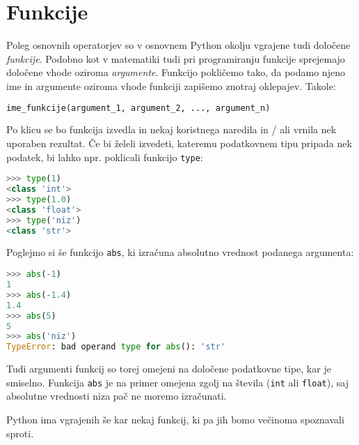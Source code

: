 \section{Funkcije}
Poleg osnovnih operatorjev so v osnovnem Python okolju vgrajene tudi določene \emph{funkcije}. Podobno kot v matematiki tudi pri programiranju funkcije sprejemajo določene vhode oziroma \emph{argumente}. Funkcijo pokličemo tako, da podamo njeno ime in argumente oziroma vhode funkciji zapišemo znotraj oklepajev. Takole:
\begin{lstlisting}[language=Python, showstringspaces=false]
ime_funkcije(argument_1, argument_2, ..., argument_n)
\end{lstlisting}
Po klicu se bo funkcija izvedla in nekaj koristnega naredila in / ali vrnila nek uporaben rezultat. Če bi želeli izvedeti, kateremu podatkovnem tipu pripada nek podatek, bi lahko npr. poklicali funkcijo \texttt{type}:
\begin{lstlisting}[language=Python, showstringspaces=false]
>>> type(1)
<class 'int'>
>>> type(1.0)
<class 'float'>
>>> type('niz')
<class 'str'>
\end{lstlisting}
Poglejmo si še funkcijo \texttt{abs}, ki izračuna absolutno vrednost podanega argumenta:
\begin{lstlisting}[language=Python, showstringspaces=false]
>>> abs(-1)
1
>>> abs(-1.4)
1.4
>>> abs(5)
5
>>> abs('niz')
TypeError: bad operand type for abs(): 'str'
\end{lstlisting}
Tudi argumenti funkcij so torej omejeni na določene podatkovne tipe, kar je smiselno. Funkcija \texttt{abs} je na primer omejena zgolj na števila (\texttt{int} ali \texttt{float}), saj absolutne vrednosti niza pač ne moremo izračunati.

Python ima vgrajenih še kar nekaj funkcij, ki pa jih bomo večinoma spoznavali sproti. 

